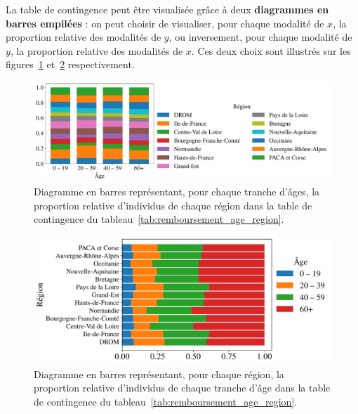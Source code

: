 La table de contingence peut être visualisée grâce à deux \textbf{diagrammes en
	barres empilées} : on peut choisir de visualiser, pour chaque modalité de $x$, la
proportion relative des modalités de $y$, ou inversement, pour chaque modalité de $y$,
la proportion relative des modalités de $x$. Ces deux choix sont illustrés sur les
figures~\ref{fig:remboursement_age_region_lines}
et~\ref{fig:remboursement_age_region_cols} respectivement.

\begin{figure}[H]
	\centering
	\includegraphics[width=\textwidth]{figures/stats/remboursement_age_region_lines}
	\caption{Diagramme en barres représentant, pour chaque tranche d'âges, la
		proportion relative d'individus de chaque région dans la table de
		contingence du tableau~\ref{tab:remboursement_age_region}.}
	\label{fig:remboursement_age_region_lines}
\end{figure}

\begin{figure}[H]
	\centering
	\includegraphics[width=\textwidth]{figures/stats/remboursement_age_region_cols}
	\caption{Diagramme en barres représentant, pour chaque région, la proportion
		relative d'individus de chaque tranche d'âge dans la table de contingence du
		tableau~\ref{tab:remboursement_age_region}.}
	\label{fig:remboursement_age_region_cols}
\end{figure}




